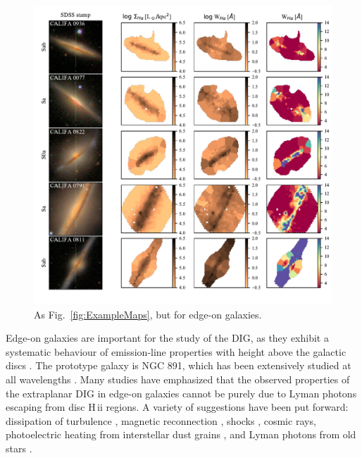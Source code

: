 \documentclass[a4paper, fleqn, usenatbib, useAMS]{mnras}
\newcommand{\hii}{H\,{\sc ii}\xspace}
\begin{document}
\begin{figure}
 \includegraphics{figs/fig_maps_class_edgeon_paper.pdf}
 \caption{As Fig.\ \ref{fig:ExampleMaps}, but for edge-on galaxies.}
 \label{fig:ExampleMapsEdgeOn}
\end{figure}

Edge-on galaxies are important for the study of the DIG, as they exhibit a systematic behaviour of emission-line properties with height above the galactic discs \citep{Tullmann.and.Dettmar.2000, Otte.etal.2002, Jones.etal.2017}. The prototype galaxy is NGC 891, which has been extensively studied at all wavelengths \citep{Rand.1998, Hodges.and.Bregman.2013, Seon.etal.2014, Hughes.etal.2015}. Many studies have emphasized that the observed properties of the extraplanar DIG in edge-on galaxies cannot be purely due to  Lyman photons escaping from disc \hii regions. A variety of suggestions have been put forward: dissipation of turbulence \citep{Minter.and.Spangler.1997}, magnetic reconnection \citep{Raymond.1992}, shocks \citep{Collins.and.Rand.2001}, cosmic rays, photoelectric heating from interstellar dust grains \citep{Weingartner.and.Draine.2001}, and Lyman photons from old stars \citep{FloresFajardo.etal.2011a}.
\end{document}
